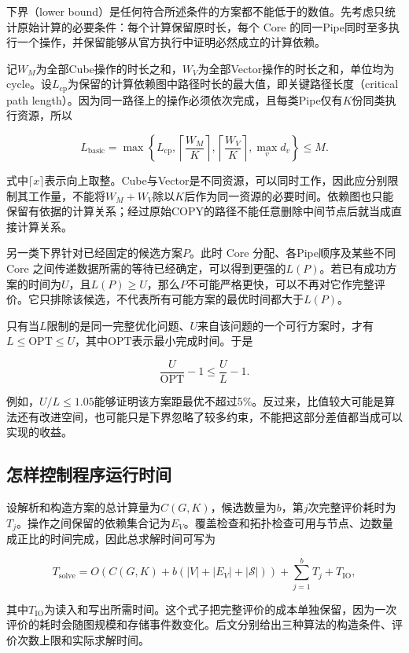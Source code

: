 \documentclass[anonymous,notoc]{gmcm2026}
\begin{document}
下界（lower bound）是任何符合所述条件的方案都不能低于的数值。先考虑只统计原始计算的必要条件：每个计算保留原时长，每个 Core 的同一Pipe同时至多执行一个操作，并保留能够从官方执行中证明必然成立的计算依赖。

记\(W_M\)为全部Cube操作的时长之和，\(W_V\)为全部Vector操作的时长之和，单位均为cycle。设\(L_{\mathrm{cp}}\)为保留的计算依赖图中路径时长的最大值，即关键路径长度（critical path length）。因为同一路径上的操作必须依次完成，且每类Pipe仅有\(K\)份同类执行资源，所以

\[L_{\mathrm{basic}}=\max\left\{L_{\mathrm{cp}},\left\lceil\frac{W_M}{K}\right\rceil,\left\lceil\frac{W_V}{K}\right\rceil,\max_vd_v\right\}\le M.\]

式中\(\lceil x\rceil\)表示向上取整。Cube与Vector是不同资源，可以同时工作，因此应分别限制其工作量，不能将\(W_M+W_V\)除以\(K\)后作为同一资源的必要时间。依赖图也只能保留有依据的计算关系；经过原始COPY的路径不能任意删除中间节点后就当成直接计算关系。

另一类下界针对已经固定的候选方案\(P\)。此时 Core 分配、各Pipe顺序及某些不同 Core 之间传递数据所需的等待已经确定，可以得到更强的\(L(P)\)。若已有成功方案的时间为\(U\)，且\(L(P)\ge U\)，那么\(P\)不可能严格更快，可以不再对它作完整评价。它只排除该候选，不代表所有可能方案的最优时间都大于\(L(P)\)。

只有当\(L\)限制的是同一完整优化问题、\(U\)来自该问题的一个可行方案时，才有\(L\le\mathrm{OPT}\le U\)，其中\(\mathrm{OPT}\)表示最小完成时间。于是

\[\frac{U}{\mathrm{OPT}}-1\le\frac UL-1.\]

例如，\(U/L\le1.05\)能够证明该方案距最优不超过5\%。反过来，比值较大可能是算法还有改进空间，也可能只是下界忽略了较多约束，不能把这部分差值都当成可以实现的收益。

\subsection{怎样控制程序运行时间}

设解析和构造方案的总计算量为\(C(G,K)\)，候选数量为\(b\)，第\(j\)次完整评价耗时为\(T_j\)。操作之间保留的依赖集合记为\(E_V\)。覆盖检查和拓扑检查可用与节点、边数量成正比的时间完成，因此总求解时间可写为

\[T_{\mathrm{solve}}=O\!\left(C(G,K)+b(|V|+|E_V|+|\mathcal S|)\right)+\sum_{j=1}^{b}T_j+T_{\mathrm{IO}},\]

其中\(T_{\mathrm{IO}}\)为读入和写出所需时间。这个式子把完整评价的成本单独保留，因为一次评价的耗时会随图规模和存储事件数变化。后文分别给出三种算法的构造条件、评价次数上限和实际求解时间。
\end{document}
